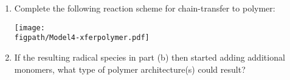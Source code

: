 \begin{activity}
\begin{exercises}
		\begin{enumerate}
			
			\item Complete the following reaction scheme for chain-transfer to polymer:
	
			\centerline{\texttt{[image: \\figpath/Model4-xferpolymer.pdf]}}
			
			\item If the resulting radical species in part (b) then started adding additional monomers, what type of polymer architecture(s) could result?
		\end{enumerate}
	
\end{exercises}


%
%	


	
\end{activity}